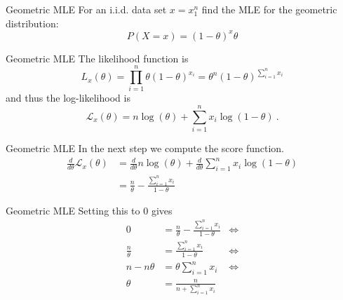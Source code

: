 \documentclass[14pt]{beamer}
\begin{document}
\begin{frame}{Geometric MLE}
For an i.i.d. data set $ x = x_{1}^{n} $ find the MLE for the geometric distribution:
$$ P(X=x) = (1-\theta)^{x}\theta $$
\end{frame}

\begin{frame}{Geometric MLE}
The likelihood function is
$$ L_{x}(\theta) = \prod_{i=1}^{n} \theta(1-\theta)^{x_{i}} = \theta^{n} (1-\theta)^{\sum_{i=1}^{n}x_{i}} $$
and thus the log-likelihood is
$$ \mathcal{L}_{x}(\theta) = n\log(\theta) + \sum_{i=1}^{n}x_{i}\log(1-\theta) \ . $$
\end{frame}

\begin{frame}{Geometric MLE}
In the next step we compute the score function.
\begin{align*}
\frac{d}{d\theta}\mathcal{L}_{x}(\theta) &= \frac{d}{d\theta}n\log(\theta) + \frac{d}{d\theta}\sum_{i=1}^{n}x_{i}\log(1-\theta) \\
&= \frac{n}{\theta} - \frac{\sum_{i=1}^{n}x_{i}}{1-\theta}
\end{align*}
\end{frame}

\begin{frame}{Geometric MLE}
Setting this to 0 gives
\begin{align*}
0 &= \frac{n}{\theta} - \frac{\sum_{i=1}^{n}x_{i}}{1-\theta} &\Leftrightarrow \\
\frac{n}{\theta} &= \frac{\sum_{i=1}^{n}x_{i}}{1-\theta} &\Leftrightarrow \\
n - n\theta &= \theta \sum_{i=1}^{n}x_{i} &\Leftrightarrow \\
\theta &= \frac{n}{n + \sum_{i=1}^{n}x_{i}}&
\end{align*}
\end{frame}
\end{document}
